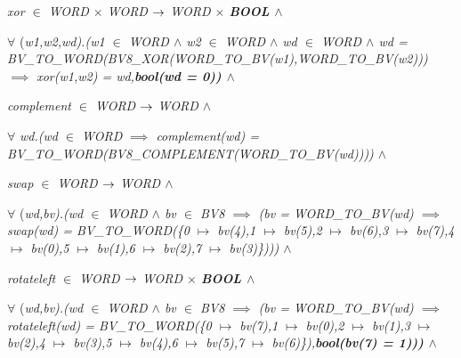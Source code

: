 \begin{sloppypar}
\hspace*{0.10in}\it xor $\in$  \it WORD $\times$ \it WORD  $\rightarrow$  \it WORD $\times$ \bf BOOL  $\land$ 

\hspace*{0.10in} $\forall$ \rm (\it w1\rm ,\it w2\rm ,\it wd\rm )\rm .\rm (\it w1 $\in$  \it WORD  $\land$  \it w2 $\in$  \it WORD  $\land$  \it wd $\in$  \it WORD  $\land$  \it wd \rm = \it BV\_TO\_WORD\rm (\it BV8\_XOR\rm (\it WORD\_TO\_BV\rm (\it w1\rm )\rm ,\it WORD\_TO\_BV\rm (\it w2\rm )\rm )\rm )  $\implies$  \it xor\rm (\it w1\rm ,\it w2\rm ) \rm = \it wd\rm ,\bf bool\rm (\it wd \rm = \rm 0\rm )\rm )  $\land$ 

\hspace*{0.10in}\it complement $\in$  \it WORD  $\rightarrow$  \it WORD  $\land$ 

\hspace*{0.10in} $\forall$ \it wd\rm .\rm (\it wd $\in$  \it WORD  $\implies$  \it complement\rm (\it wd\rm ) \rm = \it BV\_TO\_WORD\rm (\it BV8\_COMPLEMENT\rm (\it WORD\_TO\_BV\rm (\it wd\rm )\rm )\rm )\rm )  $\land$ 

\hspace*{0.10in}\it swap $\in$  \it WORD  $\rightarrow$  \it WORD  $\land$ 

\hspace*{0.10in} $\forall$ \rm (\it wd\rm ,\it bv\rm )\rm .\rm (\it wd $\in$  \it WORD  $\land$  \it bv $\in$  \it BV8  $\implies$  \rm (\it bv \rm = \it WORD\_TO\_BV\rm (\it wd\rm )  $\implies$  \it swap\rm (\it wd\rm ) \rm = \it BV\_TO\_WORD\rm (\rm \{\rm 0 $\mapsto$ \it bv\rm (\rm 4\rm )\rm ,\rm 1 $\mapsto$ \it bv\rm (\rm 5\rm )\rm ,\rm 2 $\mapsto$ \it bv\rm (\rm 6\rm )\rm ,\rm 3 $\mapsto$ \it bv\rm (\rm 7\rm )\rm ,\rm 4 $\mapsto$ \it bv\rm (\rm 0\rm )\rm ,\rm 5 $\mapsto$ \it bv\rm (\rm 1\rm )\rm ,\rm 6 $\mapsto$ \it bv\rm (\rm 2\rm )\rm ,\rm 7 $\mapsto$ \it bv\rm (\rm 3\rm )\rm \}\rm )\rm )\rm )  $\land$ 

\hspace*{0.10in}\it rotateleft $\in$  \it WORD  $\rightarrow$  \it WORD $\times$ \bf BOOL  $\land$ 

\hspace*{0.10in} $\forall$ \rm (\it wd\rm ,\it bv\rm )\rm .\rm (\it wd $\in$  \it WORD  $\land$  \it bv $\in$  \it BV8  $\implies$  \rm (\it bv \rm = \it WORD\_TO\_BV\rm (\it wd\rm )  $\implies$  \it rotateleft\rm (\it wd\rm ) \rm = \it BV\_TO\_WORD\rm (\rm \{\rm 0 $\mapsto$ \it bv\rm (\rm 7\rm )\rm ,\rm 1 $\mapsto$ \it bv\rm (\rm 0\rm )\rm ,\rm 2 $\mapsto$ \it bv\rm (\rm 1\rm )\rm ,\rm 3 $\mapsto$ \it bv\rm (\rm 2\rm )\rm ,\rm 4 $\mapsto$ \it bv\rm (\rm 3\rm )\rm ,\rm 5 $\mapsto$ \it bv\rm (\rm 4\rm )\rm ,\rm 6 $\mapsto$ \it bv\rm (\rm 5\rm )\rm ,\rm 7 $\mapsto$ \it bv\rm (\rm 6\rm )\rm \}\rm )\rm ,\bf bool\rm (\it bv\rm (\rm 7\rm ) \rm = \rm 1\rm )\rm )\rm )  $\land$ 


\end{sloppypar}
